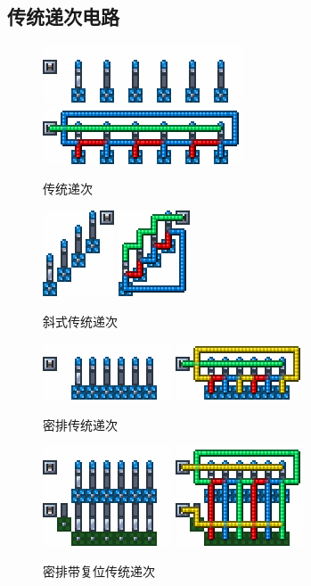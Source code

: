 \subsection{传统递次电路}\label{sec2}
\begin{figure}
    \centering
    \includegraphics{images/72.png}
    \qquad
    \includegraphics{images/73.png}
    \caption{传统递次}
\end{figure}
\begin{figure}
    \centering
    \includegraphics{images/78.png}
    \qquad
    \includegraphics{images/79.png}
    \caption{斜式传统递次}
\end{figure}
\begin{figure}
    \centering
    \includegraphics{images/82.png}
    \qquad
    \includegraphics{images/83.png}
    \caption{密排传统递次}
\end{figure}
\begin{figure}
    \centering
    \includegraphics{images/317.png}
    \qquad
    \includegraphics{images/318.png}
    \caption{密排带复位传统递次}
\end{figure}
